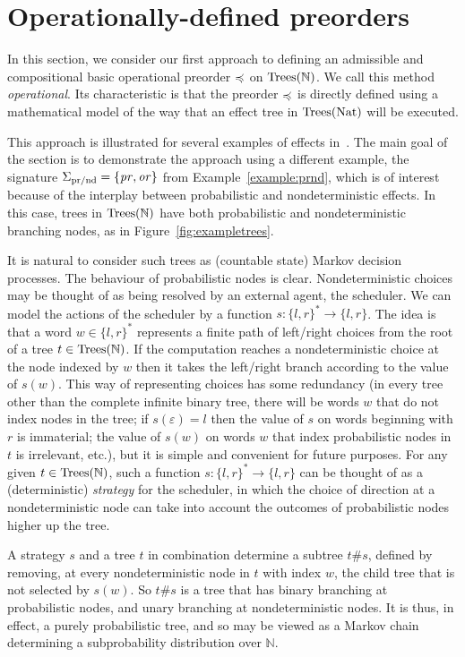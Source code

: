 \section{Operationally-defined preorders}

In this section, we consider our first approach to defining an admissible and compositional basic operational
preorder $\preccurlyeq$ on $\textnormal{Trees}(\mathbb{N})$. We call this method \emph{operational}. Its characteristic is that the preorder
 $\preccurlyeq$ is directly defined using a mathematical model of the way that an effect tree in $\textnormal{Trees}(\mathbb{\textnormal{Nat}})$ will be executed.

This approach is illustrated for several examples of effects in~\cite{gom}. 
The main goal of the section is to demonstrate the approach using a different example, the signature
$\Sigma_{\text{pr/nd}} = \{\operatorname{\mathit{pr}},\operatorname{\mathit{or}}\}$ from Example~\ref{example:prnd}, which is of interest because of the 
interplay between probabilistic and nondeterministic effects. 
In this case, trees in $\textnormal{Trees}(\mathbb{N})$ have both probabilistic and nondeterministic branching nodes,
as in Figure~\ref{fig:exampletrees}.


It is natural to consider such trees as (countable state) Markov decision processes. 
The behaviour of probabilistic nodes is clear. Nondeterministic choices may be thought of as being resolved by an external agent, the scheduler. We can model the actions of the scheduler by a 
function $s: \{l,r\}^* \to \{l,r\}$. The idea is that a word $w \in \{l,r\}^*$ represents a finite path of left/right choices from the root of a 
tree $t \in \textnormal{Trees}(\mathbb{N})$. If the computation reaches a nondeterministic choice at the node indexed by 
$w$ then it takes the left/right branch according to the value of $s(w)$. This way of representing choices has some redundancy
(in every tree other than the complete infinite binary tree, there will be words $w$ that do not index nodes in the tree; if $s(\varepsilon) = l$ then the value of $s$ on words beginning with $r$ is immaterial; the value of $s(w)$ on words $w$ that index 
probabilistic nodes in $t$ is irrelevant, etc.), but it is simple and convenient for future purposes. 
For any given $t \in \textnormal{Trees}(\mathbb{N})$, such a function
$s: \{l,r\}^* \to \{l,r\}$ can be thought of as a (deterministic) \emph{strategy} for the scheduler, in which the choice of direction at a nondeterministic node  
can take into account the outcomes of probabilistic nodes higher up the tree.

A strategy $s$ and a tree $t$ in combination determine a subtree $t\#s$, defined by 
removing, at every nondeterministic node in $t$ with index $w$, the child tree that is not selected by $s(w)$. So $t\#s$ is a tree that has binary branching at probabilistic nodes, and unary branching at nondeterministic nodes. It is thus, in effect, a purely probabilistic tree, and so may be viewed as a Markov chain determining a subprobability distribution over $\mathbb{N}$. 

